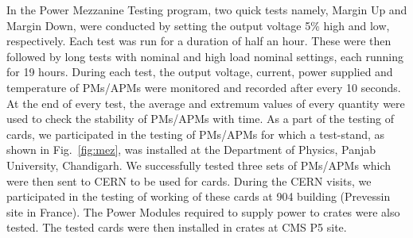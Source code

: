 \begin{comment}
\begin{table}[!htbp]
 \centering
 \caption{Four stages of the long term ($\sim$ 39 hour) stability test performed to monitor the working of Power Mezzanines/Auxiliary Power Mezzanines (PMs/APMs).}
 \label{tab:PM_test}
 \vspace{2mm}
 \begin{tabular}{ll}
 \hline\hline
 \centering
 {\bf Test Stages}  & {\bf Duration (Hours)} \rbthm\\\hline
  Marginal Down     & ~~~~~~~~~~~1/2 \rbtrr \\
  Margin Up         & ~~~~~~~~~~~1/2 \rbtrr \\
  Nominal           & ~~~~~~~~~~~19  \rbtrr \\
  High Load Nominal & ~~~~~~~~~~~19  \rbtrr \\
 \hline\hline
 \end{tabular}
\end{table}
\end{comment}

In the Power Mezzanine Testing program, two quick tests namely, Margin Up and Margin Down, were conducted by setting the output voltage 5\% high and low, respectively. Each test was run for a duration of half an hour. These were then followed by long tests with nominal and high load nominal settings, each running for 19 hours. During each test, the output voltage, current, power supplied and temperature of PMs/APMs were monitored and recorded after every 10 seconds. At the end of every test, the average and extremum values of every quantity were used to check the stability of PMs/APMs with time. As a part of the testing of \mhtr cards, we participated in the testing of PMs/APMs for which a test-stand, as shown in Fig.~\ref{fig:mez}, was installed at the Department of Physics, Panjab University, Chandigarh. We successfully tested three sets of PMs/APMs which were then sent to CERN to be used for \mhtr cards. During the CERN visits, we participated in the testing of working of these \mhtr cards at 904 building (Prevessin site in France). The Power Modules required to supply power to \mtca crates were also tested. The tested \mhtr cards were then installed in \mtca crates at CMS P5 site. 

